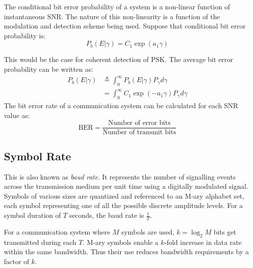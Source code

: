 The conditional bit error probability of a system is a non-linear function of instantaneous \gls{SNR}. The nature of this non-linearity is a function of the modulation and detection scheme being used\cite{dcommoha}. Suppose that conditional bit error probability is:
\begin{equation}
	P_b(E|\gamma) = C_1 \exp(a_1\gamma)
\end{equation}
\begin{mathDef}
\end{mathDef}
This would be the case for coherent detection of \gls{PSK}. The average bit error probability can be written as:
\begin{align}
	P_b(E|\gamma) &\triangleq \int_0^\infty P_b(E|\gamma)P_\gamma d\gamma \\
				  &= \int_0^\infty C_1 \exp (-a_1 \gamma)P_\gamma d\gamma \nonumber
\end{align}
The bit error rate of a communication system can be calculated for each \gls{SNR} value as:
\begin{equation}
	\text{BER} = \frac{\text{Number of error bits}}{\text{Number of transmit bits}}
\end{equation}

\subsection{Symbol Rate}
This is also known as \emph{baud rate}. It represents the number of signalling events across the transmission medium per unit time using a digitally modulated signal. Symbols of various sizes are quantized and referenced to an M-ary alphabet set, each symbol representing one of all the possible discrete amplitude levels. 
For a symbol duration of \(T\) seconds, the baud rate is \(\frac{1}{T}\).

For a communication system where \(M\) symbols are used, \(k = \log_2 M\) bits get transmitted during each \(T\). M-ary symbols enable a \(k\)-fold increase in data rate within the same bandwidth. Thus their use reduces bandwidth requirements by a factor of \(k\)\cite{AWGN}.

